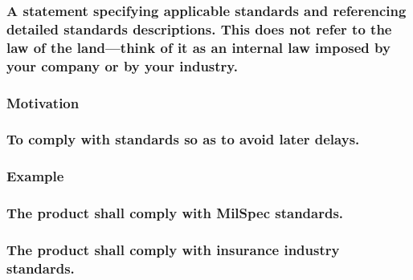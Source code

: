 \documentclass[
]{article}
\begin{document}
\hypertarget{a-statement-specifying-applicable-standards-and-referencing-detailed-standards-descriptions.-this-does-not-refer-to-the-law-of-the-landthink-of-it-as-an-internal-law-imposed-by-your-company-or-by-your-industry.}{%
\subsubsection{\texorpdfstring{A statement specifying applicable
standards and referencing detailed standards descriptions. This does not
refer to the law of the land---think of it as an internal law imposed by
your company or by your industry.
}{A statement specifying applicable standards and referencing detailed standards descriptions. This does not refer to the law of the land---think of it as an internal law imposed by your company or by your industry. }}\label{a-statement-specifying-applicable-standards-and-referencing-detailed-standards-descriptions.-this-does-not-refer-to-the-law-of-the-landthink-of-it-as-an-internal-law-imposed-by-your-company-or-by-your-industry.}}

\hypertarget{motivation-58}{%
\subsubsection{Motivation}\label{motivation-58}}

\hypertarget{to-comply-with-standards-so-as-to-avoid-later-delays.}{%
\subsubsection{To comply with standards so as to avoid later
delays.}\label{to-comply-with-standards-so-as-to-avoid-later-delays.}}

\hypertarget{example-5}{%
\subsubsection{Example}\label{example-5}}

\hypertarget{the-product-shall-comply-with-milspec-standards.}{%
\subsubsection{The product shall comply with MilSpec
standards.}\label{the-product-shall-comply-with-milspec-standards.}}

\hypertarget{the-product-shall-comply-with-insurance-industry-standards.}{%
\subsubsection{The product shall comply with insurance industry
standards.}\label{the-product-shall-comply-with-insurance-industry-standards.}}
\end{document}
